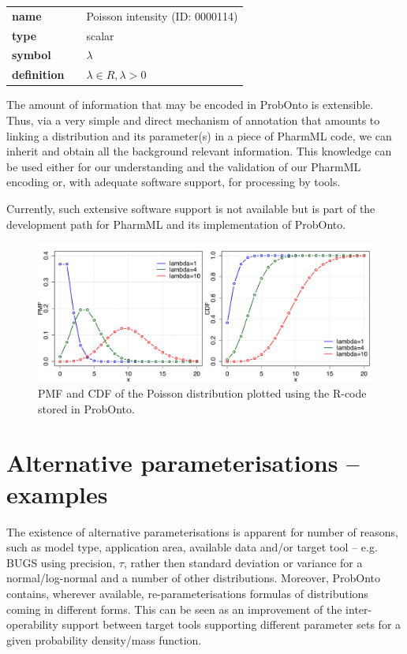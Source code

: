 {\noindent\begin{tabular}{p{2cm}cl}
\textbf{name} & & Poisson intensity  (ID: 0000114) \\
\textbf{type} & & scalar \\
\textbf{symbol} & & $\lambda$  \\
\textbf{definition} & & $\lambda \in R, \lambda > 0$
\end{tabular}
\bigskip 

The amount of information that may be encoded in ProbOnto is extensible. 
Thus,  via a very simple and direct mechanism of annotation that amounts to 
linking a distribution and its parameter(s) in a piece of PharmML code, we can
 inherit and obtain all the background relevant information. 
 This knowledge can be used either for our understanding and the validation of 
 our PharmML encoding or, with adequate software support, for processing by 
 tools. 
 
Currently, such extensive software support is not available but is part of the 
development path for PharmML and its implementation of ProbOnto. 

\begin{figure}[htb!]
\centering
  \includegraphics[width=140mm]{pics/Poisson.pdf}
 \caption{PMF and CDF of the Poisson distribution plotted using the R-code
 stored in ProbOnto.}
 \label{fig:PoissonExample}
\end{figure}


\section{Alternative parameterisations -- examples}
\label{sec:altParams}
The existence of alternative parameterisations is apparent for number of reasons, 
such as model type, application area, available data and/or target tool -- e.g. BUGS using 
precision, $\tau$, rather then standard deviation or variance for a normal/log-normal
and a number of other distributions. Moreover, ProbOnto contains, wherever available, 
re-parameterisations formulas of distributions coming in different forms. 
This can be seen as an improvement of the inter-operability support between target 
tools supporting different parameter sets for a given probability density/mass function.

}
